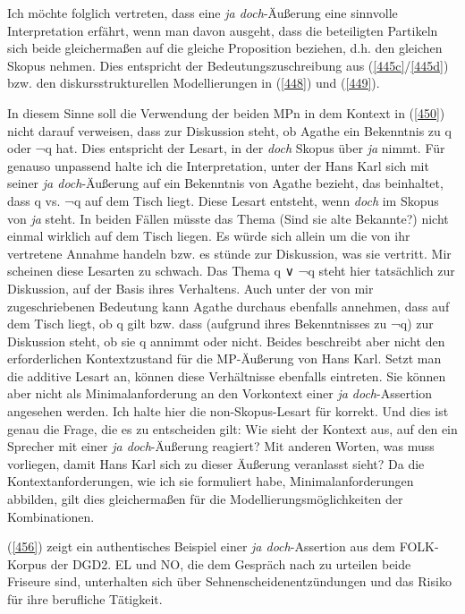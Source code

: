 Ich möchte folglich vertreten, dass eine \textit{ja doch}-Äußerung eine sinnvolle Interpretation erfährt, wenn man davon ausgeht, dass die beteiligten Partikeln sich beide gleichermaßen auf die gleiche Proposition beziehen, d.h. den gleichen Skopus nehmen. Dies entspricht der Bedeutungszuschreibung aus (\ref{445c}\slash \ref{445d}) bzw. den diskursstrukturellen Modellierungen in (\ref{448}) und (\ref{449}).

In diesem Sinne soll die Verwendung der beiden MPn in dem Kontext in (\ref{450}) nicht darauf verweisen, dass zur Diskussion steht, ob Agathe ein Bekenntnis zu q oder ¬q hat. Dies entspricht der Lesart, in der \textit{doch} Skopus über \textit{ja} nimmt. Für genauso unpassend halte ich die Interpretation, unter der Hans Karl sich mit seiner \textit{ja doch}-Äußerung auf ein Bekenntnis von Agathe bezieht, das beinhaltet, dass q vs. ¬q auf dem Tisch liegt. Diese Lesart entsteht, wenn \textit{doch} im Skopus von \textit{ja} steht. In beiden Fällen müsste das Thema (Sind sie alte Bekannte?) nicht einmal wirklich auf dem Tisch liegen. Es würde sich allein um die von ihr vertretene Annahme handeln bzw. es stünde zur Diskussion, was sie vertritt. Mir scheinen diese Lesarten zu schwach. Das Thema q ∨ ¬q steht hier tatsächlich zur Diskussion, auf der Basis ihres Verhaltens. Auch unter der von mir zugeschriebenen Bedeutung kann Agathe durchaus ebenfalls annehmen, dass auf dem Tisch liegt, ob q gilt bzw. dass (aufgrund ihres Bekenntnisses zu ¬q) zur Diskussion steht, ob sie q annimmt oder nicht. Beides beschreibt aber nicht den erforderlichen Kontextzustand für die MP-Äußerung von Hans Karl. Setzt man die additive Lesart an, können diese Verhältnisse ebenfalls eintreten. Sie können aber nicht als Minimalanforderung an den Vorkontext einer \textit{ja doch}-Assertion angesehen werden. Ich halte hier die non-Skopus-Lesart für korrekt. Und dies ist genau die Frage, die es zu entscheiden gilt: Wie sieht der Kontext aus, auf den ein Sprecher mit einer \textit{ja doch}-Äußerung reagiert? Mit anderen Worten, was muss vorliegen, damit Hans Karl sich zu dieser Äußerung veranlasst sieht? Da die Kontextanforderungen, wie ich sie formuliert habe, Minimalanforderungen abbilden, gilt dies gleichermaßen für die Modellierungsmöglichkeiten der Kombinationen.

(\ref{456}) zeigt ein authentisches Beispiel einer \textit{ja doch}-Assertion aus dem FOLK-Korpus der DGD2. EL und NO, die dem Gespräch nach zu urteilen beide Friseure sind, unterhalten sich über Sehnenscheidenentzündungen und das Risiko für ihre berufliche Tätigkeit.

